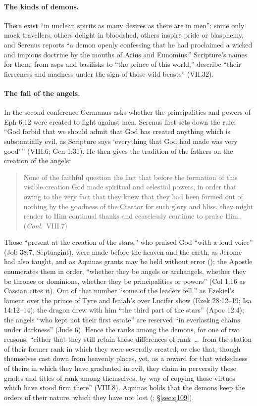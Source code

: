 \paragraph{The kinds of demons.} There exist ``in unclean spirits as many
desires as there are in men'': some only mock travellers, others delight
in bloodshed, others inspire pride or blasphemy, and Serenus reports ``a
demon openly confessing that he had proclaimed a wicked and impious
doctrine by the mouths of Arius and Eunomius.'' Scripture's names for
them, from asps and basilisks to ``the prince of this world,'' describe
``their fierceness and madness under the sign of those wild beasts''
(VII.32).

\paragraph{The fall of the angels.} In the second conference Germanus asks
whether the principalities and powers of Eph 6:12 were created to fight
against men. Serenus first sets down the rule: ``God forbid that we should
admit that God has created anything which is substantially evil, as
Scripture says `everything that God had made was very good'\,'' (VIII.6;
Gen 1:31). He then gives the tradition of the fathers on the creation of
the angels:
\begin{quote}
None of the faithful question the fact that before the formation of this
visible creation God made spiritual and celestial powers, in order that
owing to the very fact that they knew that they had been formed out of
nothing by the goodness of the Creator for such glory and bliss, they
might render to Him continual thanks and ceaselessly continue to praise
Him. (\emph{Conl.}\ VIII.7)
\end{quote}
\noindent Those ``present at the creation of the stars,'' who praised God
``with a loud voice'' (Job 38:7, Septuagint), were made before the heaven and the
earth, as Jerome had also taught, and as Aquinas grants may be held
without error (); the Apostle enumerates them in order, ``whether they be angels or
archangels, whether they be thrones or dominions, whether they be
principalities or powers'' (Col 1:16 as Cassian cites it). Out of that
number ``some of the leaders fell,'' as Ezekiel's lament over the prince
of Tyre and Isaiah's over Lucifer show (Ezek 28:12--19; Isa 14:12--14);
the dragon drew with him ``the third part of the stars'' (Apoc 12:4); the
angels ``who kept not their first estate'' are reserved ``in everlasting
chains under darkness'' (Jude 6). Hence the ranks among the demons, for one of two
reasons: ``either that they still retain those differences of rank~\dots\
from the station of their former rank in which they were severally
created, or else that, though themselves cast down from heavenly places,
yet, as a reward for that wickedness of theirs in which they have
graduated in evil, they claim in perversity these grades and titles of
rank among themselves, by way of copying those virtues which have stood
firm there'' (VIII.8). Aquinas holds that the demons keep the orders of
their nature, which they have not lost (\ST{I q.~109 a.~1};
\S\ref{sec:q109}).

